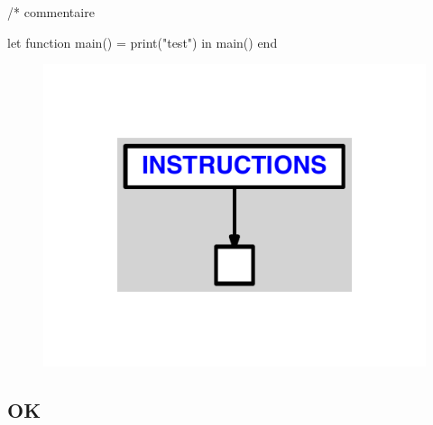 \documentclass{article}
\begin{document}
\begin{verbatimtab}
/* commentaire

let
	function main() = print("test")
in main() end
\end{verbatimtab}
\begin{figure}[H]\centering\includegraphics[max width=\textwidth]{ast/ast_149.pdf}\end{figure}\subsection{OK}
\end{document}

